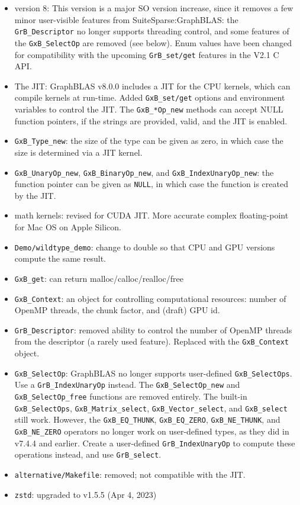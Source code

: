 \begin{itemize}
    \begin{itemize}
    \item version 8:  This version is a major SO version increase, since
        it removes a few minor user-visible features from
        SuiteSparse:GraphBLAS: the \verb'GrB_Descriptor' no longer supports
        threading control, and some features of the \verb'GxB_SelectOp' are
        removed (see below).  Enum values have been changed for compatibility
        with the upcoming \verb'GrB_set/get' features in the V2.1 C API.
    \item The JIT:  GraphBLAS v8.0.0 includes a JIT for the CPU kernels,
        which can compile kernels at run-time.  Added \verb'GxB_set/get'
        options and environment variables to control the JIT.  The
        \verb'GxB_*Op_new' methods can accept NULL function pointers, if the
        strings are provided, valid, and the JIT is enabled.
    \item \verb'GxB_Type_new': the size of the type can be given as zero,
        in which case the size is determined via a JIT kernel.
    \item \verb'GxB_UnaryOp_new', \verb'GxB_BinaryOp_new', and
        \verb'GxB_IndexUnaryOp_new': the function pointer can be given as
        \verb'NULL', in which case the function is created by the JIT.
    \item math kernels: revised for CUDA JIT.  More accurate complex
        floating-point for Mac OS on Apple Silicon.
    \item \verb'Demo/wildtype_demo': change to double so that CPU and GPU
        versions compute the same result.
    \item \verb'GxB_get': can return malloc/calloc/realloc/free
    \item \verb'GxB_Context':
        an object for controlling computational resources:
        number of OpenMP threads, the chunk factor, and (draft) GPU id.
    \item \verb'GrB_Descriptor':
        removed ability to control the number of OpenMP threads from the
        descriptor (a rarely used feature).  Replaced with the
        \verb'GxB_Context' object.
    \item \verb'GxB_SelectOp': GraphBLAS no longer supports
        user-defined \verb'GxB_SelectOps'.  Use a \verb'GrB_IndexUnaryOp'
        instead.  The \verb'GxB_SelectOp_new' and
        \verb'GxB_SelectOp_free' functions are removed entirely.
        The built-in \verb'GxB_SelectOps', \verb'GxB_Matrix_select',
        \verb'GxB_Vector_select', and \verb'GxB_select' still work.  However,
        the \verb'GxB_EQ_THUNK', \verb'GxB_EQ_ZERO', \verb'GxB_NE_THUNK', and
        \verb'GxB_NE_ZERO' operators no longer work on user-defined types,
        as they did in v7.4.4 and earlier.
        Create a user-defined \verb'GrB_IndexUnaryOp' to compute these
        operations instead, and use \verb'GrB_select'.
    \item \verb'alternative/Makefile': removed; not compatible with the JIT.
    \item \verb'zstd': upgraded to v1.5.5 (Apr 4, 2023)
    \end{itemize}


\end{itemize}
